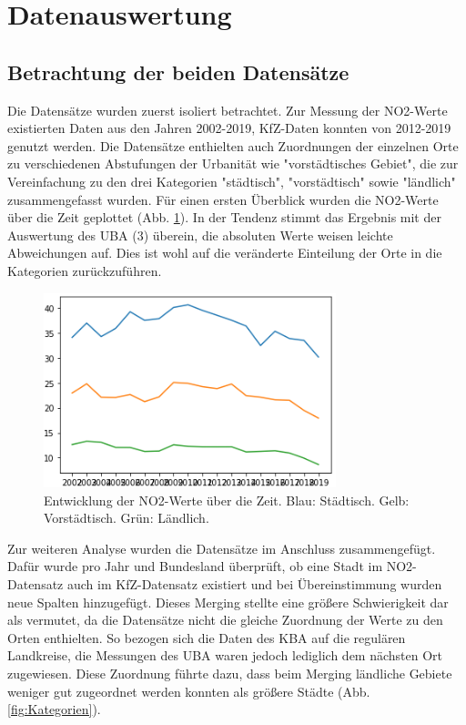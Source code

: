 \documentclass[11pt,a4paper,oneside,german]{article}
\begin{document}
	\section{Datenauswertung}
	
	\subsection{Betrachtung der beiden Datensätze}
	
	Die Datensätze wurden zuerst isoliert betrachtet. Zur Messung der NO2-Werte existierten Daten aus den Jahren 2002-2019, KfZ-Daten konnten von 2012-2019 genutzt werden. Die  Datensätze enthielten auch Zuordnungen der einzelnen Orte zu verschiedenen Abstufungen der Urbanität wie "vorstädtisches Gebiet", die zur Vereinfachung zu den drei Kategorien "städtisch", "vorstädtisch" sowie "ländlich" zusammengefasst wurden. Für einen ersten Überblick wurden die NO2-Werte über die Zeit geplottet (Abb. \ref{fig:NO2Entwicklung}). In der Tendenz stimmt das Ergebnis mit der Auswertung des UBA (3) überein, die absoluten Werte weisen leichte Abweichungen auf. Dies ist wohl auf die veränderte Einteilung der Orte in die Kategorien zurückzuführen.\\
	
	\begin{figure}[h!]
		\centering
		\includegraphics[width=8.5cm]{NO2Entwicklung.png}
		\caption{Entwicklung der NO2-Werte über die Zeit. Blau: Städtisch. Gelb: Vorstädtisch. Grün: Ländlich.}
		\label{fig:NO2Entwicklung}
	\end{figure}
	
	Zur weiteren Analyse wurden die Datensätze im Anschluss zusammengefügt. Dafür wurde pro Jahr und Bundesland überprüft, ob eine Stadt im NO2-Datensatz auch im KfZ-Datensatz existiert und bei Übereinstimmung wurden neue Spalten hinzugefügt. Dieses Merging stellte eine größere Schwierigkeit dar als vermutet, da die Datensätze nicht die gleiche Zuordnung der Werte zu den Orten enthielten. So bezogen sich die Daten des KBA auf die regulären Landkreise, die Messungen des UBA waren jedoch lediglich dem nächsten Ort zugewiesen. Diese Zuordnung führte dazu, dass beim Merging ländliche Gebiete weniger gut zugeordnet werden konnten als größere Städte (Abb. \ref{fig:Kategorien}).\\
	
\end{document}
